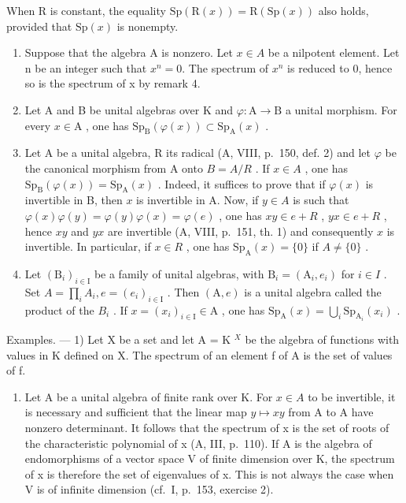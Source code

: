When R is constant, the equality \(\mathrm{Sp}(\mathrm{R}(x)) = \mathrm{R}(\mathrm{Sp}(x))\) also holds, provided that \(\mathrm{Sp}(x)\) is nonempty.

\begin{enumerate}
\def\labelenumi{\arabic{enumi})}
\setcounter{enumi}{4}
\item
  Suppose that the algebra A is nonzero. Let \(x \in A\) be a nilpotent element. Let n be an integer such that \(x^{n} = 0\). The spectrum of \(x^{n}\) is reduced to 0, hence so is the spectrum of x by remark 4.
\item
  Let A and B be unital algebras over K and \(\varphi\colon\mathrm{A}\to\mathrm{B}\) a unital morphism. For every \(x\in\mathrm{A}\) , one has \(\mathrm{Sp}_{\mathrm{B}}(\varphi(x))\subset\mathrm{Sp}_{\mathrm{A}}(x)\) .
\item
  Let A be a unital algebra, R its radical (A, VIII, p.~150, def. 2) and let \(\varphi\) be the canonical morphism from A onto \(B = A/R\) . If \(x \in A\) , one has \(\mathrm{Sp}_{\mathrm{B}}(\varphi(x)) = \mathrm{Sp}_{\mathrm{A}}(x)\) . Indeed, it suffices to prove that if \(\varphi(x)\) is invertible in B, then \(x\) is invertible in A. Now, if \(y \in A\) is such that \(\varphi(x)\varphi(y) = \varphi(y)\varphi(x) = \varphi(e)\) , one has \(xy \in e + R\) , \(yx \in e + R\) , hence \(xy\) and \(yx\) are invertible (A, VIII, p.~151, th. 1) and consequently \(x\) is invertible. In particular, if \(x \in R\) , one has \(\mathrm{Sp}_{\mathrm{A}}(x) = \{0\}\) if \(A \neq \{0\}\) .
\item
  Let \((\mathrm{B}_{i})_{i\in\mathrm{I}}\) be a family of unital algebras, with \(\mathrm{B}_{i}=(\mathrm{A}_{i},e_{i})\) for \(i\in I\) . Set \(A=\prod_{i}A_{i}, e=(e_{i})_{i\in\mathrm{I}}\) . Then \((\mathrm{A},e)\) is a unital algebra called the product of the \(B_{i}\) . If \(x=(x_{i})_{i\in\mathrm{I}}\in\mathrm{A}\) , one has \(\mathrm{Sp}_{\mathrm{A}}(x)=\bigcup_{i}\mathrm{Sp}_{\mathrm{A}_{i}}(x_{i})\) .
\end{enumerate}

Examples. --- 1) Let X be a set and let A = K \(^{X}\) be the algebra of functions with values in K defined on X. The spectrum of an element f of A is the set of values of f.

\begin{enumerate}
\def\labelenumi{\arabic{enumi})}
\setcounter{enumi}{1}
\tightlist
\item
  Let A be a unital algebra of finite rank over K. For \(x \in A\) to be invertible, it is necessary and sufficient that the linear map \(y \mapsto xy\) from A to A have nonzero determinant. It follows that the spectrum of x is the set of roots of the characteristic polynomial of x (A, III, p.~110). If A is the algebra of endomorphisms of a vector space V of finite dimension over K, the spectrum of x is therefore the set of eigenvalues of x. This is not always the case when V is of infinite dimension (cf.~I, p.~153, exercise 2).
\end{enumerate}

